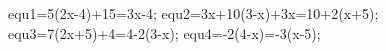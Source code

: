 \documentclass[exercice]{thedocument}%
\begin{document}
%
    \>equ1=5(2x-4)+15=3x-4;%
    \>equ2=3x+10(3-x)+3x=10+2(x+5);%
    \>equ3=7(2x+5)+4=4-2(3-x);%
    \>equ4=-2(4-x)=-3(x-5);%
\end{document}
